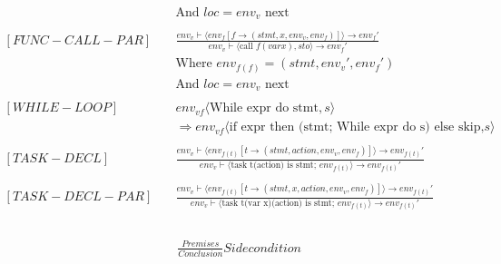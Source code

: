 \begin{align*}
                    & \text{And }loc = env_v \text{ next}  
    \\
    \\
    [FUNC-CALL-PAR] \quad &
    \frac
    {env_v \vdash \langle env_f[f \to (stmt, x, env_v, env_f)]\rangle\to env_f \prime}
    {env_v \vdash \langle \text{call }f(var x), sto\rangle \to env_f\prime}
    \\ & \text{Where }env_{f(f)} = (stmt, env_v\prime, env_f\prime) \\
                    & \text{And }loc = env_v \text{ next}   
    \\
    \\
    [WHILE-LOOP] \quad &
    env_{vf} \langle \text{While expr do stmt}, s \rangle \\ &  \Rightarrow env_{vf} \langle \text{if expr then (stmt; While expr do s) else skip,} s \rangle
    \\
    \\
    [TASK-DECL] \quad &
    \frac
    {env_v\vdash\langle env_{f(t)}[t \to (stmt, action, env_v, env_f)]\rangle \to env_{f(t)}\prime}
    {env_v \vdash \langle \text{task t(action) is stmt; } env_{f(t)} \rangle \to env_{f(t)}\prime}
    \\
    \\
    [TASK-DECL-PAR] \quad &
    \frac
    {env_v\vdash\langle env_{f(t)}[t \to (stmt, x, action, env_v, env_f)]\rangle \to env_{f(t)}\prime}
    {env_v \vdash \langle \text{task t(var x)(action) is stmt; } env_{f(t)} \rangle \to env_{f(t)}\prime}
    \\
    \\
\end{align*}


\begin{align*}
    [RULE]     \quad &
    \frac
    {Premises}
    {Conclusion}
    Side condition
\end{align*}
